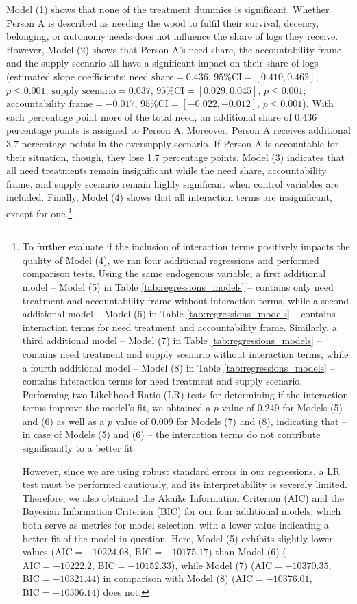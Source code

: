 \documentclass[egregdoesnotlikesansseriftitles]{scrartcl}
\begin{document}
Model (1) shows that none of the treatment dummies is significant.
Whether Person A is described as needing the wood to fulfil their survival, decency, belonging, or autonomy needs does not influence the share of logs they receive.
However, Model (2) shows that Person A's need share, the accountability frame, and the supply scenario all have a significant impact on their share of logs (estimated slope coefficients: $\text{need share}=0.436$, $\text{95\% CI}=[0.410,0.462]$, $p\le0.001$; $\text{supply scenario}=0.037$, $\text{95\% CI}=[0.029,0.045]$, $p\le0.001$; $\text{accountability frame}=-0.017$, $\text{95\% CI}=[-0.022,-0.012]$, $p\le0.001$).
With each percentage point more of the total need, an additional share of 0.436 percentage points is assigned to Person A.
Moreover, Person A receives additional 3.7 percentage points in the oversupply scenario.
If Person A is accountable for their situation, though, they lose 1.7 percentage points.
Model (3) indicates that all need treatments remain insignificant while the need share, accountability frame, and supply scenario remain highly significant when control variables are included.
Finally, Model (4) shows that all interaction terms are insignificant, except for one.\footnote{To further evaluate if the inclusion of interaction terms positively impacts the quality of Model (4), we ran four additional regressions and performed comparison tests.
Using the same endogenous variable, a first additional model -- Model (5) in Table \ref{tab:regressions_models} -- contains only need treatment and accountability frame without interaction terms, while a second additional model -- Model (6) in Table \ref{tab:regressions_models} -- contains interaction terms for need treatment and accountability frame.
Similarly, a third additional model -- Model (7) in Table \ref{tab:regressions_models} -- contains need treatment and supply scenario without interaction terms, while a fourth additional model -- Model (8) in Table \ref{tab:regressions_models} -- contains interaction terms for need treatment and supply scenario.
Performing two Likelihood Ratio (LR) tests for determining if the interaction terms improve the model's fit, we obtained a $p$ value of 0.249 for Models (5) and (6) as well as a $p$ value of 0.009 for Models (7) and (8), indicating that -- in case of Models (5) and (6) -- the interaction terms do not contribute significantly to a better fit

However, since we are using robust standard errors in our regressions, a LR test must be performed cautiously, and its interpretability is severely limited.
Therefore, we also obtained the Akaike Information Criterion (AIC) and the Bayesian Information Criterion (BIC) for our four additional models, which both serve as metrics for model selection, with a lower value indicating a better fit of the model in question.
Here, Model (5) exhibits slightly lower values ($\text{AIC}=-10224.08$, $\text{BIC}=-10175.17$) than Model (6) ($\text{AIC}=-10222.2$, $\text{BIC}=-10152.33$), while Model (7) ($\text{AIC}=-10370.35$, $\text{BIC}=-10321.44$) in comparison with Model (8) ($\text{AIC}=-10376.01$, $\text{BIC}=-10306.14$) does not.}
\end{document}
